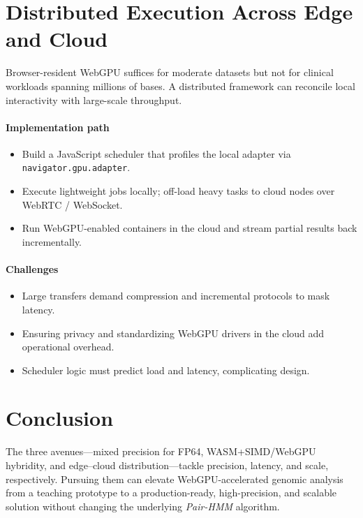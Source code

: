 \documentclass[PhD]{PHlab-thesis}
\begin{document}
\section{Distributed Execution Across Edge and Cloud}

Browser-resident WebGPU suffices for moderate datasets but not for clinical workloads spanning millions of bases. A distributed framework can reconcile local interactivity with large-scale throughput.

\paragraph{Implementation path}
\begin{itemize}
  \item Build a JavaScript scheduler that profiles the local adapter via \texttt{navigator.gpu.adapter}.
  \item Execute lightweight jobs locally; off-load heavy tasks to cloud nodes over WebRTC / WebSocket.
  \item Run WebGPU-enabled containers in the cloud and stream partial results back incrementally.
\end{itemize}

\paragraph{Challenges}
\begin{itemize}
  \item Large transfers demand compression and incremental protocols to mask latency.
  \item Ensuring privacy and standardizing WebGPU drivers in the cloud add operational overhead.
  \item Scheduler logic must predict load and latency, complicating design.
\end{itemize}

\section*{Conclusion}

The three avenues—mixed precision for FP64, WASM+SIMD/WebGPU hybridity, and edge–cloud distribution—tackle precision, latency, and scale, respectively. Pursuing them can elevate WebGPU-accelerated genomic analysis from a teaching prototype to a production-ready, high-precision, and scalable solution without changing the underlying \emph{Pair-HMM} algorithm.
\end{document}
